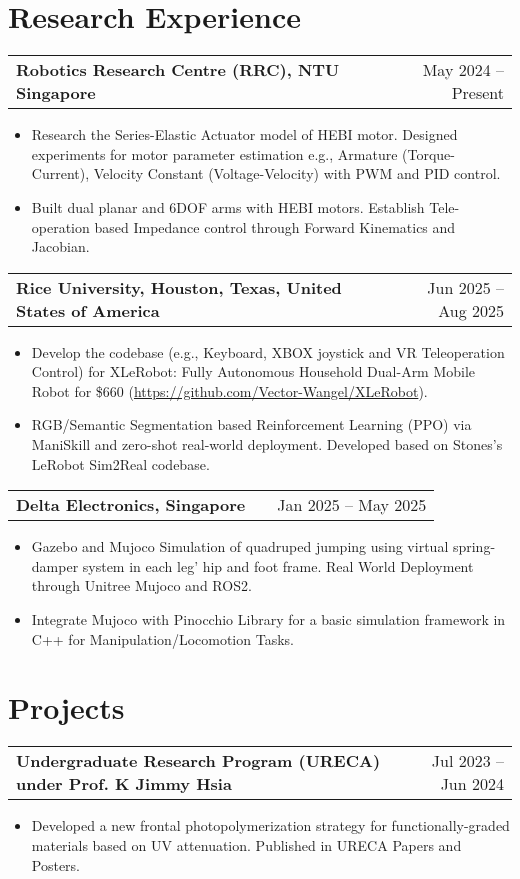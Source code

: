 \documentclass[a4paper,11pt]{article}
\makeatletter
\newenvironment{joblong}[2]
    {
    \begin{tabularx}{\linewidth}{@{}l X r@{}}
    \textbf{#1} & \hfill &  #2 \\[3.75pt]
    \end{tabularx}
    \begin{minipage}[t]{\linewidth}
    \begin{itemize}[nosep,after=\strut, leftmargin=1em, itemsep=3pt,label=--]
    }
    {
    \end{itemize}
    \end{minipage}    
    }
\makeatother
\begin{document}
\section{Research Experience}
\begin{joblong}{Robotics Research Centre (RRC), NTU Singapore}{May 2024 -- Present}
\item Research the Series-Elastic Actuator model of HEBI motor. Designed experiments for motor parameter estimation e.g., Armature (Torque-Current), Velocity Constant (Voltage-Velocity) with PWM and PID control.
\item Built dual planar and 6DOF arms with HEBI motors. Establish Tele-operation based Impedance control through Forward Kinematics and Jacobian.
\end{joblong}

\begin{joblong}{Rice University, Houston, Texas, United States of America}{Jun 2025 -- Aug 2025}
\item Develop the codebase (e.g., Keyboard, XBOX joystick and VR Teleoperation Control) for XLeRobot: Fully Autonomous Household Dual-Arm Mobile Robot for \$660 (\url{https://github.com/Vector-Wangel/XLeRobot}). 
\item RGB/Semantic Segmentation based Reinforcement Learning (PPO) via ManiSkill and zero-shot real-world deployment. Developed based on Stones's LeRobot Sim2Real codebase.
\end{joblong}

\begin{joblong}{Delta Electronics, Singapore}{Jan 2025 -- May 2025}
\item Gazebo and Mujoco Simulation of quadruped jumping using virtual spring-damper system in each leg' hip and foot frame. Real World Deployment through Unitree Mujoco and ROS2.
\item Integrate Mujoco with Pinocchio Library for a basic simulation framework in C++ for Manipulation/Locomotion Tasks.
\end{joblong}

\section{Projects}
\begin{joblong}{Undergraduate Research Program (URECA) under Prof. K Jimmy Hsia}{Jul 2023 -- Jun 2024}
\item Developed a new frontal photopolymerization strategy for functionally-graded materials based on UV attenuation. Published in URECA Papers and Posters.
\end{joblong}
\end{document}
